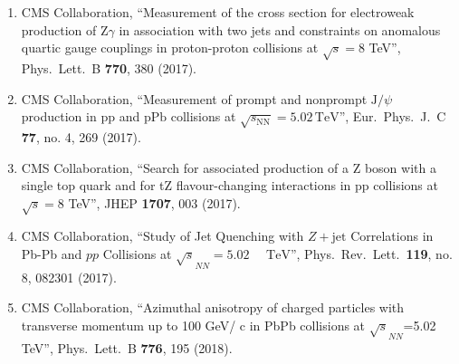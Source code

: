 \begin{itemize}
\begin{enumerate}
\item CMS Collaboration, ``Measurement of the cross section for electroweak production of Z$\gamma$ in association with two jets and constraints on anomalous quartic gauge couplings in proton-proton collisions at $\sqrt{s} = 8$ TeV'', Phys.\ Lett.\ B {\bf 770}, 380 (2017).

\item CMS Collaboration, ``Measurement of prompt and nonprompt $\mathrm{J}/{\psi }$ production in $\mathrm {p}\mathrm {p}$ and $\mathrm {p}\mathrm {Pb}$ collisions at $\sqrt{s_{\mathrm {NN}}} =5.02\,\text {TeV} $'', Eur.\ Phys.\ J.\ C {\bf 77}, no. 4, 269 (2017).

\item CMS Collaboration, ``Search for associated production of a Z boson with a single top quark and for tZ flavour-changing interactions in pp collisions at $ \sqrt{s}=8 $ TeV'', JHEP {\bf 1707}, 003 (2017).

\item CMS Collaboration, ``Study of Jet Quenching with $Z+\text{jet}$ Correlations in Pb-Pb and $pp$ Collisions at ${\sqrt{s}}_{NN}=5.02\text{ }\text{ }\mathrm{TeV}$'', Phys.\ Rev.\ Lett.\  {\bf 119}, no. 8, 082301 (2017).

\item CMS Collaboration, ``Azimuthal anisotropy of charged particles with transverse momentum up to 100 GeV/ c in PbPb collisions at $\sqrt {s}_{{NN}}$=5.02 TeV'', Phys.\ Lett.\ B {\bf 776}, 195 (2018).


\end{enumerate}
\end{itemize}
